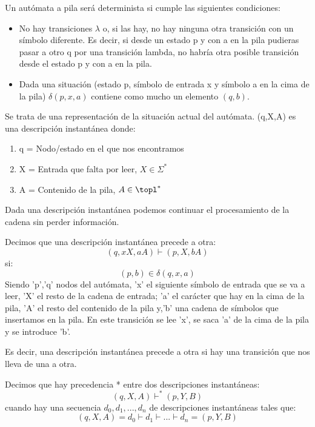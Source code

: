 \documentclass{apuntes}
\begin{document}
\begin{defn}
Un autómata a pila será determinista si cumple las siguientes condiciones:
\begin{itemize}
\item No hay transiciones $\lambda$ o, si las hay, no hay ninguna otra transición con un símbolo diferente. Es decir, si desde un estado p y con a en la pila pudieras pasar a otro q por una transición lambda, no habría otra posible transición desde el estado p y con a en la pila.
\item Dada una situación (estado p, símbolo de entrada x y símbolo a en la cima de la pila) $\delta (p,x,a)$ contiene como mucho un elemento $(q,b)$.
\end{itemize}
\end{defn}

\begin{defn}
Se trata de una representación de la situación actual del autómata. (q,X,A) es una descripción instantánea donde:\\
\begin{enumerate}
\item q = Nodo/estado en el que nos encontramos
\item X = Entrada que falta por leer, $X \in \Sigma^{*}$
\item A = Contenido de la pila, $A \in \topl^{*}$
\end{enumerate}

Dada una descripción instantánea podemos continuar el procesamiento de la cadena sin perder información.
\end{defn}

\begin{defn}
Decimos que una descripción instantánea precede a otra:
\[(q,xX,aA) \vdash (p, X, bA)\]
si:
\[(p,b) \in \delta(q, x, a)\]
Siendo 'p','q' nodos del autómata, 'x' el siguiente símbolo de entrada que se va a leer, 'X' el resto de la cadena de entrada; 'a' el carácter que hay en la cima de la pila, 'A' el resto del contenido de la pila y,'b' una cadena de símbolos que insertamos en la pila. En este transición se lee 'x', se saca 'a' de la cima de la pila y se introduce 'b'.

Es decir, una descripción instantánea precede a otra si hay una transición que nos lleva de una a otra.

\end{defn}

\begin{defn}[Precedencia *]
Decimos que hay precedencia * entre dos descripciones instantáneas:
\[(q,X,A) \vdash^* (p, Y, B)\]
cuando hay una secuencia $d_0,d_1,..., d_n$ de descripciones instantáneas tales que:
\[(q,X,A) = d_0 \vdash d_1 \vdash ... \vdash d_n = (p, Y, B)\]
\end{defn}
\end{document}
